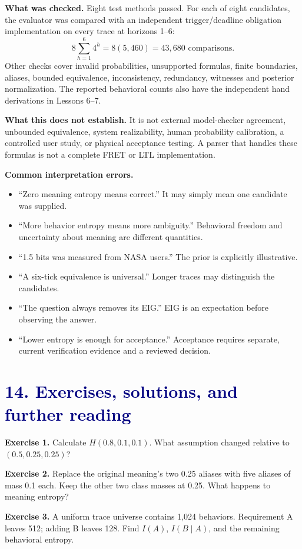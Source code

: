 \documentclass[11pt,a4paper]{article}
\newcommand{\lesson}[2]{\section*{\textcolor{navy}{#1. #2}}}
\begin{document}
\textbf{What was checked.} Eight test methods passed. For each of eight candidates, the evaluator was compared with an independent trigger/deadline obligation implementation on every trace at horizons 1--6:
\[
8\sum_{h=1}^{6}4^h=8(5,460)=43,680\text{ comparisons}.
\]
Other checks cover invalid probabilities, unsupported formulas, finite boundaries, aliases, bounded equivalence, inconsistency, redundancy, witnesses and posterior normalization. The reported behavioral counts also have the independent hand derivations in Lessons 6--7.

\textbf{What this does not establish.} It is not external model-checker agreement, unbounded equivalence, system realizability, human probability calibration, a controlled user study, or physical acceptance testing. A parser that handles these formulas is not a complete FRET or LTL implementation.

\textbf{Common interpretation errors.}
\begin{itemize}
\item ``Zero meaning entropy means correct.'' It may simply mean one candidate was supplied.
\item ``More behavior entropy means more ambiguity.'' Behavioral freedom and uncertainty about meaning are different quantities.
\item ``1.5 bits was measured from NASA users.'' The prior is explicitly illustrative.
\item ``A six-tick equivalence is universal.'' Longer traces may distinguish the candidates.
\item ``The question always removes its EIG.'' EIG is an expectation before observing the answer.
\item ``Lower entropy is enough for acceptance.'' Acceptance requires separate, current verification evidence and a reviewed decision.
\end{itemize}
\newpage

\lesson{14}{Exercises, solutions, and further reading}
\textbf{Exercise 1.} Calculate \(H(0.8,0.1,0.1)\). What assumption changed relative to \((0.5,0.25,0.25)\)?

\textbf{Exercise 2.} Replace the original meaning's two 0.25 aliases with five aliases of mass 0.1 each. Keep the other two class masses at 0.25. What happens to meaning entropy?

\textbf{Exercise 3.} A uniform trace universe contains 1,024 behaviors. Requirement A leaves 512; adding B leaves 128. Find \(I(A)\), \(I(B\mid A)\), and the remaining behavioral entropy.
\end{document}
